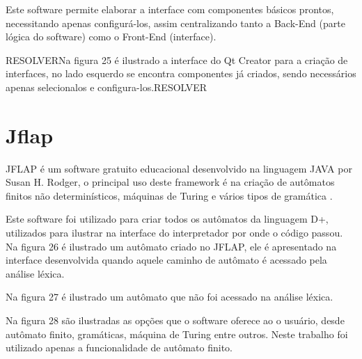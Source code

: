 \documentclass[12pt,oneside,a4paper,chapter=TITLE,section=TITLE,sumario=tradicional]{abntex2}
\begin{document}
Este software permite elaborar a interface com componentes básicos prontos, necessitando apenas configurá-los, assim centralizando tanto a Back-End (parte lógica do software) como o Front-End (interface). 

RESOLVERNa figura 25 é ilustrado a interface do Qt Creator para a criação de interfaces, no lado esquerdo se encontra componentes já criados, sendo necessários apenas selecionalos e configura-los.RESOLVER

\begin{figure}[htb]
\end{figure} 

\section{Jflap}
\label{sec:jflap}

JFLAP é um software gratuito educacional desenvolvido na linguagem JAVA por Susan H. Rodger, o principal uso deste framework é na criação de autômatos finitos não determinísticos, máquinas de Turing e vários tipos de gramática \cite{susan2005}.

Este software foi utilizado para criar todos os autômatos da linguagem D+, utilizados para ilustrar na interface do interpretador por onde o código passou. Na figura 26 é ilustrado um autômato criado no JFLAP, ele é apresentado na interface desenvolvida quando aquele caminho de autômato é acessado pela análise léxica.

\begin{figure}[htb]
\end{figure} 

Na figura 27 é ilustrado um autômato que não foi acessado na análise léxica.

\begin{figure}[H]
\end{figure} 

Na figura 28 são ilustradas as opções que o software oferece ao o usuário, desde autômato finito, gramáticas, máquina de Turing entre outros. Neste trabalho foi utilizado apenas a funcionalidade de autômato finito.

\begin{figure}[htb]
\end{figure} 
\end{document}

